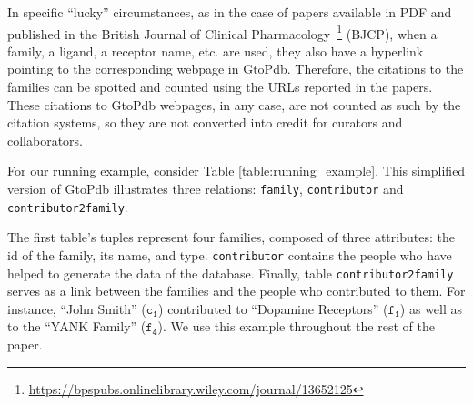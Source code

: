 In specific ``lucky'' circumstances, as in the case of papers available in PDF and published in the British Journal of Clinical Pharmacology~\footnote{\url{https://bpspubs.onlinelibrary.wiley.com/journal/13652125}} (BJCP), when a  family, a ligand, a receptor name, etc. are used, they also have a hyperlink pointing to the corresponding webpage in GtoPdb. Therefore, the citations to the families can be spotted and counted using the URLs reported in the papers.
These citations to GtoPdb webpages, in any case, are not counted as such by the citation systems, so they are not converted into credit for curators and collaborators. 

For our running example, consider Table \ref{table:running_example}. This simplified version of GtoPdb illustrates three relations: \texttt{family}, \texttt{contributor} and \texttt{contributor2family}.

The first table's tuples represent four families, composed of three attributes: the id of the family, its name, and type. 
\texttt{contributor} contains the people who have helped to generate the data of the database.
Finally, table \texttt{contributor2family} serves as a link between the families and the people who contributed to them.
For instance, ``John Smith'' ($\mathtt{c_1}$) contributed to ``Dopamine Receptors'' ($\mathtt{f_1}$) as well as to the ``YANK Family'' ($\mathtt{f_4}$). We use this example throughout the rest of the paper.

